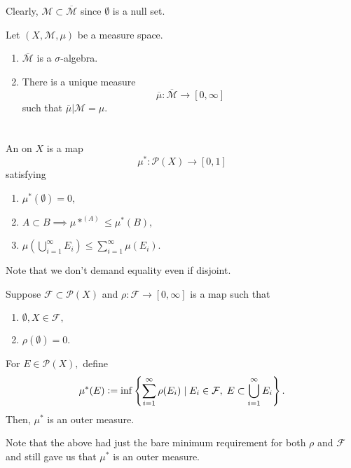 \documentclass[12pt]{article}	%
\begin{document}
Clearly, $\mathcal{M} \subset \overline{\mathcal{M}}$ since $\emptyset$ is a null set.

\begin{prop}
	Let $(X, \mathcal{M}, \mu)$ be a measure space.
	\begin{enumerate}
		\item $\overline{\mathcal{M}}$ is a $\sigma$-algebra.
		\item There is a unique measure
		\begin{equation*} 
			\overline{\mu} : \overline{\mathcal{M}} \to [0, \infty]
		\end{equation*}
		such that $\overline{\mu}|\mathcal{M} = \mu.$
	\end{enumerate}
\end{prop}

\section{} %

\begin{defn}
	An  on $X$ is a map
	\begin{equation*} 
		\mu^* : \mathcal{P}(X) \to [0, 1]
	\end{equation*}
	satisfying
	\begin{enumerate}
		\item $\mu^*(\emptyset) = 0,$
		\item $A \subset B \implies \mu*^(A) \le \mu^*(B),$
		\item $\mu\left(\bigcup_{i = 1}^\infty E_i\right) \le \sum_{i = 1}^{\infty} \mu(E_i).$
	\end{enumerate}
\end{defn}
Note that we don't demand equality even if disjoint.

\begin{prop} \label{prop:constructoutermeasure}
	Suppose $\mathcal{F} \subset \mathcal{P}(X)$ and $\rho : \mathcal{F} \to [0, \infty]$ is a map such that
	\begin{enumerate}
		\item $\emptyset, X \in \mathcal{F},$
		\item $\rho(\emptyset) = 0.$
	\end{enumerate}
	For $E \in \mathcal{P}(X),$ define
	\begin{equation*} 
		\mu^*(E) \vcentcolon= \inf\left\{\sum_{i = 1}^{\infty}\rho(E_i) \mid E_i \in \mathcal{F},\; E \subset \bigcup_{i = 1}^\infty E_i\right\}.
	\end{equation*}
	Then, $\mu^*$ is an outer measure.
\end{prop}
Note that the above had just the bare minimum requirement for both $\rho$ and $\mathcal{F}$ and still gave us that $\mu^*$ is an outer measure.
\end{document}
